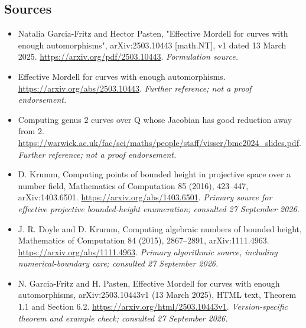\documentclass[11pt]{article}
\begin{document}
\subsection{Sources}
\begin{itemize}
\item[S1]Natalia Garcia-Fritz and Hector Pasten, "Effective Mordell for curves with enough automorphisms", arXiv:2503.10443 [math.NT], v1 dated 13 March 2025.
\url{https://arxiv.org/pdf/2503.10443}.
\textit{Formulation source.}
\item[S2]Effective Mordell for curves with enough automorphisms.
\url{https://arxiv.org/abs/2503.10443}.
\textit{Further reference; not a proof endorsement.}
\item[S3]Computing genus 2 curves over Q whose Jacobian has good reduction away from 2.
\url{https://warwick.ac.uk/fac/sci/maths/people/staff/visser/bmc2024_slides.pdf}.
\textit{Further reference; not a proof endorsement.}
\item[E1]D. Krumm, Computing points of bounded height in projective space over a number field, Mathematics of Computation 85 (2016), 423--447, arXiv:1403.6501.
\url{https://arxiv.org/abs/1403.6501}.
\textit{Primary source for effective projective bounded-height enumeration; consulted 27 September 2026.}
\item[E2]J. R. Doyle and D. Krumm, Computing algebraic numbers of bounded height, Mathematics of Computation 84 (2015), 2867--2891, arXiv:1111.4963.
\url{https://arxiv.org/abs/1111.4963}.
\textit{Primary algorithmic source, including numerical-boundary care; consulted 27 September 2026.}
\item[E3]N. Garcia-Fritz and H. Pasten, Effective Mordell for curves with enough automorphisms, arXiv:2503.10443v1 (13 March 2025), HTML text, Theorem 1.1 and Section 6.2.
\url{https://arxiv.org/html/2503.10443v1}.
\textit{Version-specific theorem and example check; consulted 27 September 2026.}
\end{itemize}
\end{document}
